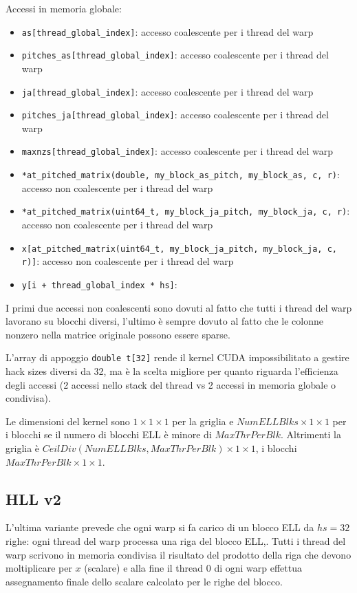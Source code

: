 \documentclass[a4paper,9pt]{extarticle}
\begin{document}
Accessi in memoria globale:
\begin{itemize}
	\item \texttt{as[thread\_global\_index]}: accesso coalescente per i thread del warp
	\item \texttt{pitches\_as[thread\_global\_index]}: accesso coalescente per i thread del warp
	\item \texttt{ja[thread\_global\_index]}: accesso coalescente per i thread del warp
	\item \texttt{pitches\_ja[thread\_global\_index]}: accesso coalescente per i thread del warp
	\item \texttt{maxnzs[thread\_global\_index]}: accesso coalescente per i thread del warp
	\item \texttt{*at\_pitched\_matrix(double, my\_block\_as\_pitch, my\_block\_as, c, r)}: accesso non coalescente per i 
	thread del warp
	\item \texttt{*at\_pitched\_matrix(uint64\_t, my\_block\_ja\_pitch, my\_block\_ja, c, r)}: accesso non coalescente per 
	i thread del warp
	\item \texttt{x[\*at\_pitched\_matrix(uint64\_t, my\_block\_ja\_pitch, my\_block\_ja, c, r)]}: accesso non coalescente 
	per i thread del warp
	\item \texttt{y[i + thread\_global\_index * hs]}:
\end{itemize}

I primi due accessi non coalescenti sono dovuti al fatto che tutti i thread del warp lavorano su blocchi diversi,
l'ultimo è sempre dovuto al fatto che le colonne nonzero nella matrice originale possono essere sparse.

L'array di appoggio \texttt{double t[32]} rende il kernel CUDA impossibilitato a gestire hack sizes diversi da 32, 
ma è la scelta migliore per quanto riguarda l'efficienza degli accessi (2 accessi nello stack del thread vs 2 accessi
in memoria globale o condivisa).

Le dimensioni del kernel sono $1 \times 1 \times 1$ per la griglia e $NumELLBlks \times 1 \times 1$ per i blocchi se il numero di blocchi ELL è minore di $MaxThrPerBlk$. Altrimenti la griglia è $CeilDiv(NumELLBlks, MaxThrPerBlk) \times 1 \times 1$, i blocchi $MaxThrPerBlk \times 1 \times 1$. 

\subsection{HLL v2}
L'ultima variante prevede che ogni warp si fa carico di un blocco ELL da $hs=32$ righe: ogni thread del warp processa
una riga del blocco ELL,. Tutti i thread del warp scrivono in memoria condivisa il risultato del prodotto della riga che
devono moltiplicare per $x$ (scalare)
e alla fine il thread 0 di ogni warp effettua assegnamento finale dello scalare calcolato per 
le righe del blocco.
\end{document}
